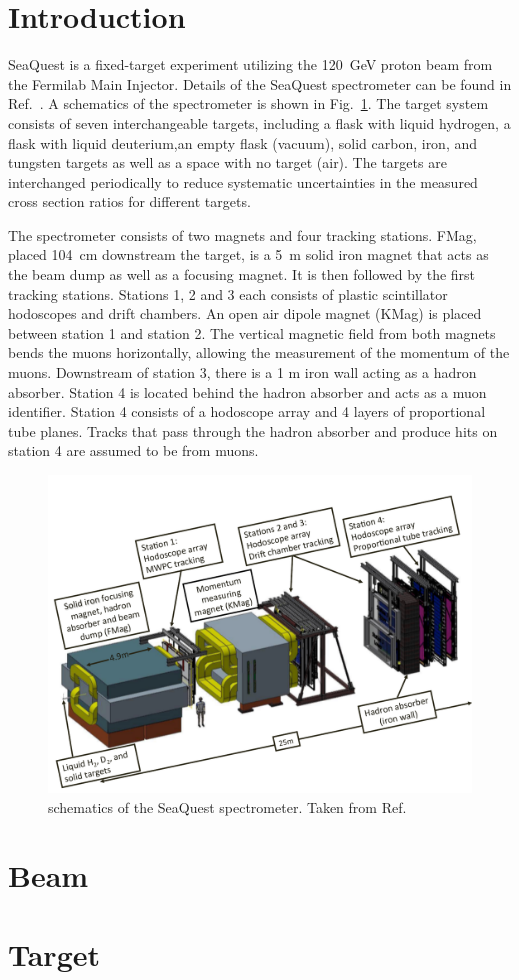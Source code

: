\section{Introduction}
SeaQuest is a fixed-target experiment utilizing the \SI{120}{\GeV} proton beam 
from the Fermilab Main Injector. Details of the SeaQuest spectrometer can be 
found in Ref.\ \cite{aidala2019}. A schematics of the spectrometer is shown in 
Fig.\ \ref{fig:spectrometer}. The target system consists of seven 
interchangeable targets, including a flask with liquid hydrogen, a flask with 
liquid deuterium,an empty flask (vacuum), solid carbon, iron, and tungsten 
targets as well as a space with no target (air). The targets are interchanged 
periodically to reduce systematic uncertainties in the measured cross section 
ratios for different targets.

The spectrometer consists of two magnets and four tracking stations. FMag, 
placed \SI{104}{\cm} downstream the target, is a \SI{5}{\m} solid iron magnet 
that acts as the beam dump as well as a focusing magnet. It is then followed by
the first tracking stations. Stations 1, 2 and 3 each consists of plastic 
scintillator hodoscopes and drift chambers. An open air dipole magnet (KMag) is
placed between station 1 and station 2. The vertical magnetic field from both 
magnets bends the muons horizontally, allowing the measurement of the momentum 
of the muons. Downstream of station 3, there is a 1 m iron wall acting as a 
hadron absorber. Station 4 is located behind the hadron absorber and acts as a 
muon identifier. Station 4 consists of a hodoscope array and 4 layers of 
proportional tube planes. Tracks that pass through the hadron absorber and 
produce hits on station 4 are assumed to be from muons. 

\begin{figure}[htbp!]
    \centering
    \includegraphics[width=0.6\linewidth]{./images/SeaQuestSpectrometer}
    \caption{schematics of the SeaQuest spectrometer. Taken from Ref.\ 
		\cite{aidala2019}}
    \label{fig:spectrometer}
\end{figure}


\section{Beam}

\section{Target}

